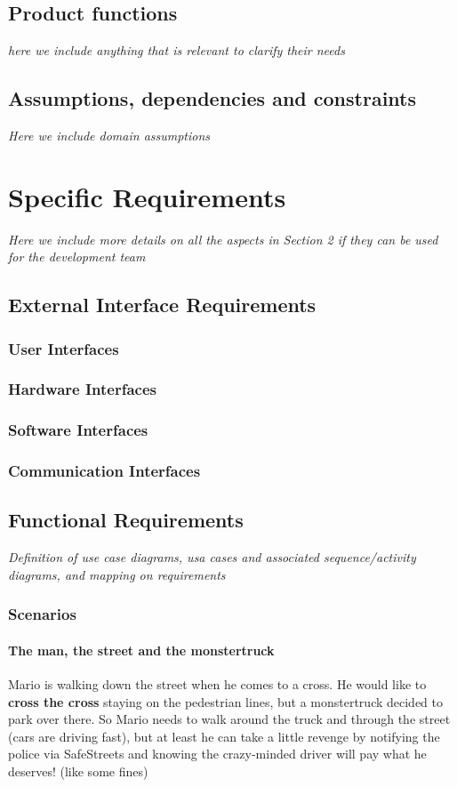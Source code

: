 \documentclass{article}
\begin{document}
	\subsection{Product functions}\textit{here we include anything that is relevant to clarify their needs}
	\subsection{Assumptions, dependencies and constraints} \textit{Here we include domain assumptions}
\section{Specific Requirements} \textit{Here we include more details on all the aspects in Section 2 if they can be used for the development team}
	\subsection{External Interface Requirements}
		\subsubsection{User Interfaces}
		\subsubsection{Hardware Interfaces}
		\subsubsection{Software Interfaces}
		\subsubsection{Communication Interfaces}
	\subsection{Functional Requirements} \textit{Definition of use case diagrams, usa cases and associated sequence/activity diagrams, and mapping on requirements}
		\subsubsection{Scenarios}
			\paragraph{The man, the street and the monstertruck}
				Mario is walking down the street when he comes to a cross. He would like to \textbf{cross the cross} staying on the pedestrian lines, but a monstertruck decided to park over there. So Mario needs to walk around the truck and through the street (cars are driving fast), but at least he can take a little revenge by notifying the police via SafeStreets and knowing the crazy-minded driver will pay what he deserves! (like some fines)
\end{document}
